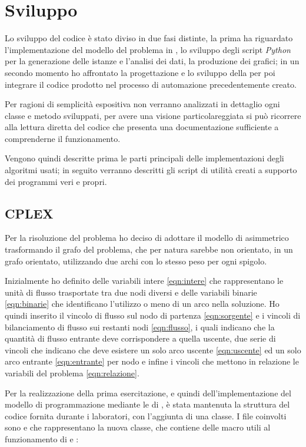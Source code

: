 \section{Sviluppo}
Lo sviluppo del codice è stato diviso in due fasi distinte, la prima ha riguardato l'implementazione del modello del problema in , lo sviluppo degli script \emph{Python} per la generazione delle istanze e l'analisi dei dati, la produzione dei grafici; in un secondo momento ho affrontato la progettazione e lo sviluppo della \tabu per poi integrare il codice prodotto nel processo di automazione precedentemente creato.

Per ragioni di semplicità espositiva non verranno analizzati in dettaglio ogni classe e metodo sviluppati, per avere una visione particolareggiata si può ricorrere alla lettura diretta del codice che presenta una documentazione sufficiente a comprenderne il funzionamento.

Vengono quindi descritte prima le parti principali delle implementazioni degli algoritmi usati; in seguito verranno descritti gli script di utilità creati a supporto dei programmi veri e propri.

\subsection{CPLEX}
Per la risoluzione del problema ho deciso di adottare il modello di  asimmetrico trasformando il grafo del problema, che per natura sarebbe non orientato, in un grafo orientato, utilizzando due archi con lo stesso peso per ogni spigolo.

Inizialmente ho definito delle variabili intere \eqref{eqn:intere} che rappresentano le unità di flusso trasportate tra due nodi diversi e delle variabili binarie \eqref{eqn:binarie} che identificano l'utilizzo o meno di un arco nella soluzione.
Ho quindi inserito il vincolo di flusso sul nodo di partenza \eqref{eqn:sorgente} e i vincoli di bilanciamento di flusso sui restanti nodi \eqref{eqn:flusso}, i quali indicano che la quantità di flusso entrante deve corrispondere a quella uscente, due serie di vincoli che indicano che deve esistere un solo arco uscente \eqref{eqn:uscente} ed un solo arco entrante \eqref{eqn:entrante} per nodo e infine i vincoli che mettono in relazione le variabili del problema \eqref{eqn:relazione}.

Per la realizzazione della prima esercitazione, e quindi dell'implementazione del modello di programmazione mediante le  di , è stata mantenuta la struttura del codice fornita durante i laboratori, con l'aggiunta di una classe.
I file coinvolti sono  e  che rappresentano la nuova classe,  che contiene delle macro utili al funzionamento di  e :

